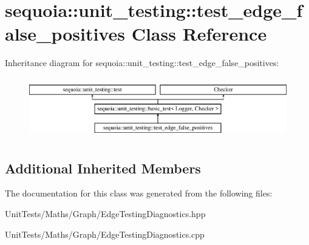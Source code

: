 \hypertarget{classsequoia_1_1unit__testing_1_1test__edge__false__positives}{}\section{sequoia\+::unit\+\_\+testing\+::test\+\_\+edge\+\_\+false\+\_\+positives Class Reference}
\label{classsequoia_1_1unit__testing_1_1test__edge__false__positives}
Inheritance diagram for sequoia\+::unit\+\_\+testing\+::test\+\_\+edge\+\_\+false\+\_\+positives\+:\begin{figure}[H]
\begin{center}
\leavevmode
\includegraphics[height=2.666667cm]{classsequoia_1_1unit__testing_1_1test__edge__false__positives}
\end{center}
\end{figure}
\subsection*{Additional Inherited Members}


The documentation for this class was generated from the following files\+:\begin{DoxyCompactItemize}
\item 
Unit\+Tests/\+Maths/\+Graph/Edge\+Testing\+Diagnostics.\+hpp\item 
Unit\+Tests/\+Maths/\+Graph/Edge\+Testing\+Diagnostics.\+cpp\end{DoxyCompactItemize}
